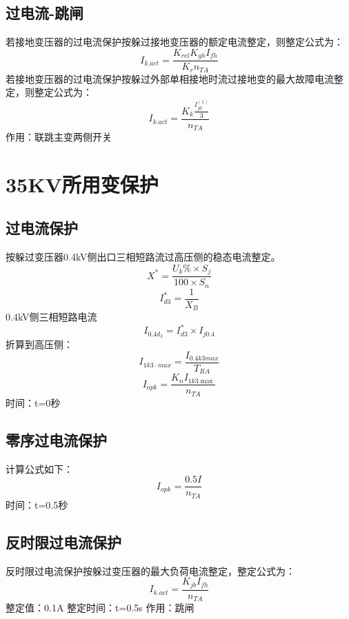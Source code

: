 \subsection{过电流-跳闸}
若接地变压器的过电流保护按躲过接地变压器的额定电流整定，则整定公式为：
$$
I_{k.act}=\frac{K_{rel}K_{gh}I_{fh}}{K_rn_{TA}}
$$
若接地变压器的过电流保护按躲过外部单相接地时流过接地变的最大故障电流整定，则整定公式为：
$$
I_{k.act}=\frac{K_k\frac{I_{jd}^{(1)}}{3}}{n_{TA}}
$$
作用：联跳主变两侧开关
\section{35KV所用变保护}
\subsection{过电流保护}
按躲过变压器0.4kV侧出口三相短路流过高压侧的稳态电流整定。
$$
X^*=\frac{U_k\%\times S_j}{100\times S_n}
$$
$$
I^{*}_{d3}=\frac{1}{X_B}
$$
0.4kV侧三相短路电流
$$
I_{0.4d_{3}}=I^{*}_{d3}\times I_{j0.4}
$$
折算到高压侧：
$$
I_{1k3\cdot max}=\frac{I_{0.4k3max}}{T_{RA}}
$$
$$
I_{opk}=\frac{K_nI_{1k3\max}}{n_{TA}}
$$
时间：t=0秒
\subsection{零序过电流保护}
计算公式如下：
$$
I_{opk}=\frac{0.5I}{n_{TA}}
$$
时间：t=0.5秒
\subsection{反时限过电流保护}
反时限过电流保护按躲过变压器的最大负荷电流整定，整定公式为：
$$
I_{k.act}=\frac{K_{jb}I_{fh}}{n_{TA}}
$$
整定值：0.1A \newline
整定时间：t=0.5s \newline
作用：跳闸

\addtocounter{page}{-1}


